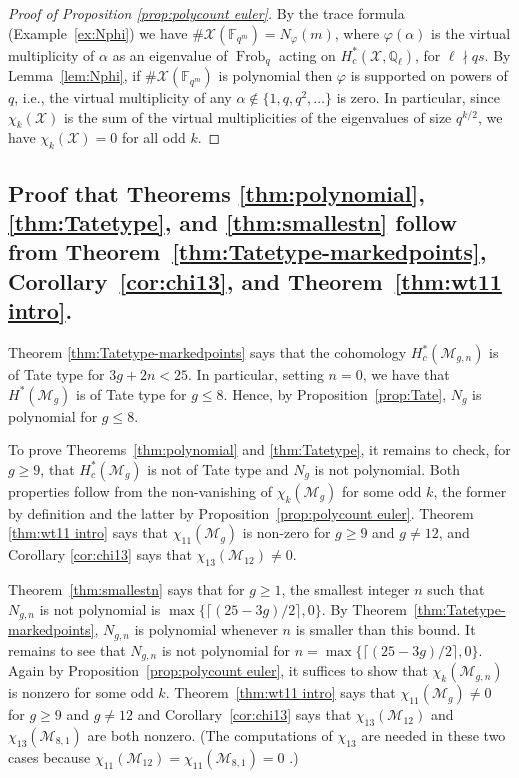 \documentclass[12pt]{amsart}
\theoremstyle{definition}
\numberwithin{equation}{section}
\newcommand{\F}{\mathbb{F}}
\newcommand{\M}{\mathcal{M}}
\DeclareMathOperator{\Frob}{Frob}
\newcommand{\Q}{\mathbb{Q}}
\newcommand{\cM}{\mathcal{M}}
\newcommand{\cX}{\mathcal{X}}
\theoremstyle{definition} %
\theoremstyle{remark}
\begin{document}
\begin{proof}[Proof of Proposition \ref{prop:polycount euler}]
By the trace formula (Example~\ref{ex:Nphi}) we have $\#\cX(\F_{q^m}) = N_\varphi(m)$, where $\varphi(\alpha)$ is the virtual multiplicity of $\alpha$ as an eigenvalue of $\Frob_q$ acting on $H^*_c(\cX, \Q_\ell)$, for $\ell \nmid q s$.  By Lemma~\ref{lem:Nphi}, if $\#\cX(\F_{q^m})$ is polynomial then $\varphi$ is supported on powers of $q$, i.e., the virtual multiplicity of any $\alpha \not \in \{1, q, q^2, \ldots \}$ is zero. In particular, since $\chi_k(\cX)$ is the sum of the virtual multiplicities of the eigenvalues of size $q^{k/2}$, we have $\chi_k(\cX) = 0$ for all odd $k$.
\end{proof}

\subsection{Proof that Theorems \ref{thm:polynomial}, \ref{thm:Tatetype}, and \ref{thm:smallestn} follow from Theorem~\ref{thm:Tatetype-markedpoints}, Corollary~\ref{cor:chi13}, and Theorem~\ref{thm:wt11 intro}.}
Theorem \ref{thm:Tatetype-markedpoints} says that the cohomology $H^*_c(\cM_{g,n})$ is of Tate type for $3g + 2n < 25$. In particular, setting $n = 0$, we have that $H^*(\M_g)$ is of Tate type for $g \leq 8$.  Hence, by Proposition~\ref{prop:Tate}, $N_{g}$ is polynomial for $g \leq 8$. 

To prove Theorems~\ref{thm:polynomial} and  \ref{thm:Tatetype}, it remains to check, for $g \geq 9$, that $H^*_c(\M_{g})$ is not of Tate type and $N_g$ is not polynomial. Both properties follow from the non-vanishing of $\chi_k(\cM_g)$ for some odd $k$, the former by definition and the latter by Proposition~\ref{prop:polycount euler}.  Theorem \ref{thm:wt11 intro} says that $\chi_{11}(\cM_g)$ is non-zero for $g\geq 9$ and $g\neq 12$, and Corollary \ref{cor:chi13} says that $\chi_{13}(\cM_{12}) \neq 0$.

Theorem~\ref{thm:smallestn} says that for $g \geq 1$, the smallest integer $n$ such that $N_{g,n}$ is not polynomial is $\max\{ \lceil (25-3g)/2 \rceil, 0 \}.$ By Theorem~\ref{thm:Tatetype-markedpoints}, $N_{g,n}$ is polynomial whenever $n$ is smaller than this bound. It remains to see that $N_{g,n}$ is not polynomial for $n = \max\{ \lceil (25-3g)/2 \rceil, 0 \}$.  Again by Proposition~\ref{prop:polycount euler}, it suffices to show that $\chi_k(\M_{g,n})$ is nonzero for some odd $k$.  Theorem~\ref{thm:wt11 intro} says that $\chi_{11}(\cM_g) \neq 0$ for $g \geq 9$ and $g \neq 12$ and Corollary~\ref{cor:chi13} says that $\chi_{13}(\cM_{12})$ and $\chi_{13}(\cM_{8,1})$ are both nonzero.  (The computations of $\chi_{13}$ are needed in these two cases because $\chi_{11}(\cM_{12}) = \chi_{11}(\cM_{8,1}) = 0$%
.)
\end{document}
